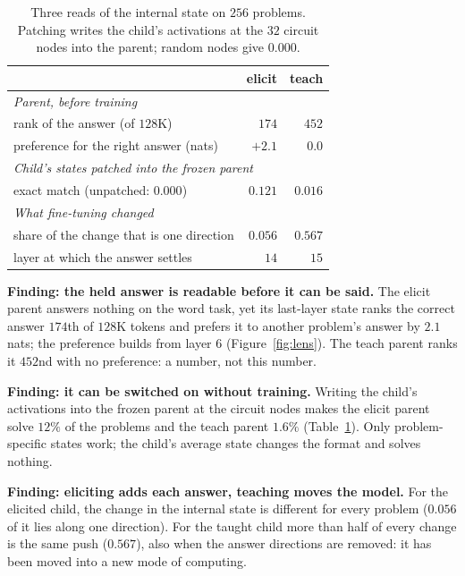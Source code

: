 \documentclass{article}
\theoremstyle{definition}
\begin{document}
\begin{table}[t]
\centering
\small
\setlength{\tabcolsep}{4pt}
\begin{tabular}{lrr}
\toprule
 & elicit & teach \\
\midrule
\multicolumn{3}{l}{\emph{Parent, before training}} \\
rank of the answer (of $128$K) & $174$ & $452$ \\
preference for the right answer (nats) & $+2.1$ & $0.0$ \\
\midrule
\multicolumn{3}{l}{\emph{Child's states patched into the frozen parent}} \\
exact match (unpatched: $0.000$) & $0.121$ & $0.016$ \\
\midrule
\multicolumn{3}{l}{\emph{What fine-tuning changed}} \\
share of the change that is one direction & $0.056$ & $0.567$ \\
layer at which the answer settles & $14$ & $15$ \\
\bottomrule
\end{tabular}
\caption{Three reads of the internal state on $256$ problems. Patching writes the child's activations at the
$32$ circuit nodes into the parent; random nodes give $0.000$.}
\label{tab:state}
\end{table}

\textbf{Finding: the held answer is readable before it can be said.} The elicit parent answers nothing on the word
task, yet its last-layer state ranks the correct answer $174$th of $128$K tokens and prefers it to another
problem's answer by $2.1$ nats; the preference builds from layer $6$ (Figure~\ref{fig:lens}). The teach parent
ranks it $452$nd with no preference: a number, not this number.

\textbf{Finding: it can be switched on without training.} Writing the child's activations into the frozen parent
at the circuit nodes makes the elicit parent solve $12\%$ of the problems and the teach parent $1.6\%$
(Table~\ref{tab:state}). Only problem-specific states work; the child's average state changes the format and
solves nothing.

\textbf{Finding: eliciting adds each answer, teaching moves the model.} For the elicited child, the change in the
internal state is different for every problem ($0.056$ of it lies along one direction). For the taught child more
than half of every change is the same push ($0.567$), also when the answer directions are removed: it has been
moved into a new mode of computing.
\end{document}
